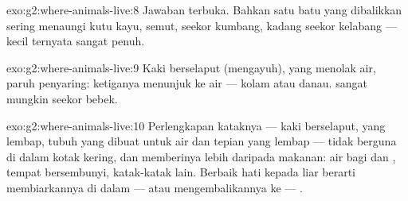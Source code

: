 \begin{solution}{exo:g2:where-animals-live:8}
Jawaban terbuka. Bahkan satu batu yang dibalikkan sering menaungi kutu
kayu, semut, seekor kumbang, kadang seekor kelabang ---  kecil
ternyata sangat penuh.
\end{solution}

\begin{solution}{exo:g2:where-animals-live:9}
Kaki berselaput (mengayuh),  yang menolak air, paruh penyaring:
ketiganya menunjuk ke air ---  kolam atau danau. 
sangat mungkin seekor bebek.
\end{solution}

\begin{solution}{exo:g2:where-animals-live:10}
Perlengkapan kataknya --- kaki berselaput,  yang lembap, tubuh
yang dibuat untuk air dan tepian yang lembap --- tidak berguna di
dalam kotak kering, dan  memberinya lebih daripada makanan:
air bagi  dan , tempat bersembunyi, katak-katak lain.
Berbaik hati kepada  liar berarti membiarkannya di dalam --- atau
mengembalikannya ke --- .
\end{solution}
